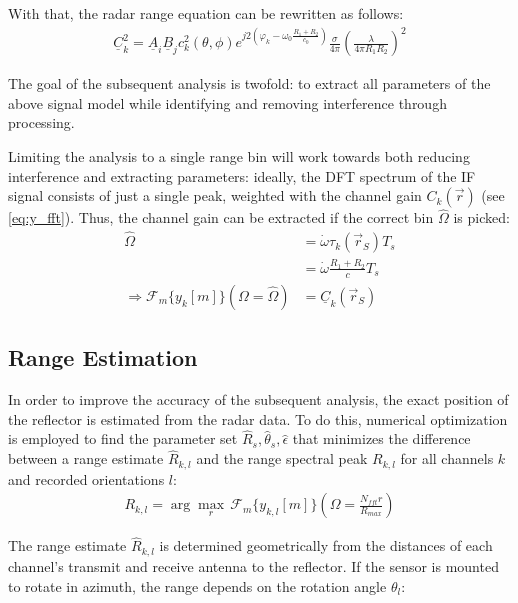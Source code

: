 With that, the radar range equation can be rewritten as follows:
\begin{align*}
  \underline C_k^2 = \underline A_i \underline B_j c_k^2(\theta,\phi) e^{j2\left(\varphi_k-\omega_0\frac{R_1+R_2}{c_0}\right)}
  \frac{\sigma}{4\pi} \left(\frac{\lambda}{4\pi R_1 R_2}\right)^2
\end{align*}

The goal of the subsequent analysis is twofold:
to extract all parameters of the above signal model while identifying and removing interference through processing.

Limiting the analysis to a single range bin will work towards both reducing interference and extracting parameters:
ideally, the DFT spectrum of the IF signal consists of just a single peak,
weighted with the channel gain $C_k(\vec r)$ (see \cref{eq:y_fft}).
Thus, the channel gain can be extracted if the correct bin $\hat \Omega$ is picked:
\begin{align}
  \hat \Omega                                               & = \dot \omega \tau_k(\vec r_S)T_s              \\
                                                            & = \dot \omega \frac{R_1+R_2}{c}T_s             \\
  \Rightarrow \mathcal{F}_m\{y_k[m]\}(\Omega = \hat \Omega) & =    \underline C_k(\vec r_S) \label{eq:G_fft}
\end{align}

\subsection{Range Estimation}
\label{sec:range_est}


In order to improve the accuracy of the subsequent analysis, the exact position of the reflector is estimated from the radar data.
To do this, numerical optimization is employed to find the parameter set
$\hat R_s, \hat \theta_s, \hat \epsilon$ that minimizes the difference between
a range estimate $\hat R_{k,l}$ and the range spectral peak $R_{k,l}$ for all channels $k$ and recorded orientations $l$:
\begin{align}
  R_{k,l} = \arg \underset{r}{\max}\,\mathcal{F}_m\{y_{k,l}[m]\}\left(\Omega = \frac{N_{fft}r}{R_{max}}\right)
\end{align}

The range estimate $\hat R_{k,l}$ is determined geometrically from the distances of each channel's
transmit and receive antenna to the reflector. If the sensor is mounted to rotate in azimuth,
the range depends on the rotation angle $\theta_l $:

